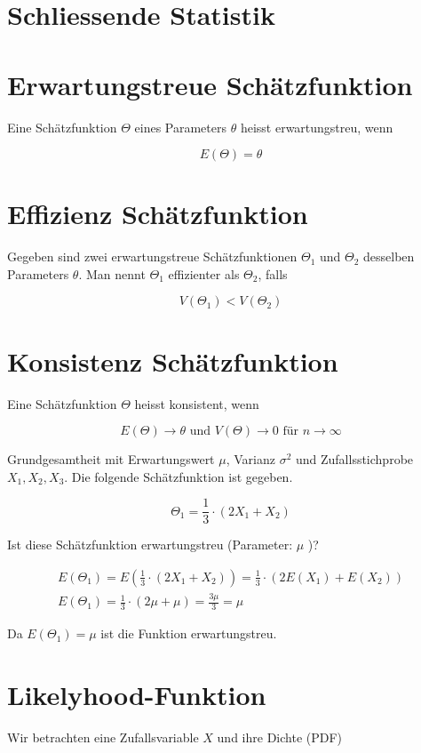 \documentclass[10pt]{article}
\begin{document}
\section*{Schliessende Statistik}
\section*{Erwartungstreue Schätzfunktion}
Eine Schätzfunktion $\Theta$ eines Parameters $\theta$ heisst erwartungstreu, wenn

$$
E(\Theta)=\theta
$$

\section*{Effizienz Schätzfunktion}
Gegeben sind zwei erwartungstreue Schätzfunktionen $\Theta_{1}$ und $\Theta_{2}$ desselben Parameters $\theta$. Man nennt $\Theta_{1}$ effizienter als $\Theta_{2}$, falls

$$
V\left(\Theta_{1}\right)<V\left(\Theta_{2}\right)
$$

\section*{Konsistenz Schätzfunktion}
Eine Schätzfunktion $\Theta$ heisst konsistent, wenn

$$
E(\Theta) \rightarrow \theta \text { und } V(\Theta) \rightarrow 0 \text { für } n \rightarrow \infty
$$

Grundgesamtheit mit Erwartungswert $\mu$, Varianz $\sigma^{2}$ und Zufallsstichprobe $X_{1}, X_{2}, X_{3}$. Die folgende Schätzfunktion ist gegeben.

$$
\Theta_{1}=\frac{1}{3} \cdot\left(2 X_{1}+X_{2}\right)
$$

Ist diese Schätzfunktion erwartungstreu (Parameter: $\mu$ )?

$$
\begin{gathered}
E\left(\Theta_{1}\right)=E\left(\frac{1}{3} \cdot\left(2 X_{1}+X_{2}\right)\right)=\frac{1}{3} \cdot\left(2 E\left(X_{1}\right)+E\left(X_{2}\right)\right) \\
E\left(\Theta_{1}\right)=\frac{1}{3} \cdot(2 \mu+\mu)=\frac{3 \mu}{3}=\mu
\end{gathered}
$$

Da $E\left(\Theta_{1}\right)=\mu$ ist die Funktion erwartungstreu.

\section*{Likelyhood-Funktion}
Wir betrachten eine Zufallsvariable $X$ und ihre Dichte (PDF)
\end{document}
